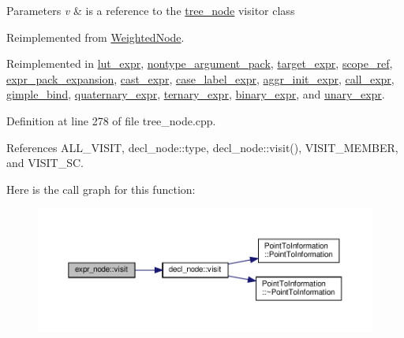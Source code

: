 \begin{DoxyParams}{Parameters}
{\em v} & is a reference to the \hyperlink{classtree__node}{tree\+\_\+node} visitor class \\
\hline
\end{DoxyParams}


Reimplemented from \hyperlink{structWeightedNode_a6f976feccb640a60f96475a668314fde}{Weighted\+Node}.



Reimplemented in \hyperlink{structlut__expr_a038fb8662e73256339281dac776155d0}{lut\+\_\+expr}, \hyperlink{structnontype__argument__pack_a254f0396e0ad2b47a793f8cb7f5b233a}{nontype\+\_\+argument\+\_\+pack}, \hyperlink{structtarget__expr_a69a7da18ea0d8b008cec659f2a24b63e}{target\+\_\+expr}, \hyperlink{structscope__ref_ab9bfdbf6812bceab436f39ea51304058}{scope\+\_\+ref}, \hyperlink{structexpr__pack__expansion_aeebf07512e982ce8b1fb21276362c6d4}{expr\+\_\+pack\+\_\+expansion}, \hyperlink{structcast__expr_a6f67dad818bc71c65e92f9105faf29f6}{cast\+\_\+expr}, \hyperlink{structcase__label__expr_ae05b2b2dac08585cdcf52aa97190ed4c}{case\+\_\+label\+\_\+expr}, \hyperlink{structaggr__init__expr_af28d5b47d09253a4ab8b59fbf776369d}{aggr\+\_\+init\+\_\+expr}, \hyperlink{structcall__expr_aeb0867ff82c5d47f5f86dd4e149f398f}{call\+\_\+expr}, \hyperlink{structgimple__bind_a63a576886251512f6238e7055819869f}{gimple\+\_\+bind}, \hyperlink{structquaternary__expr_ad01a5f8cb89a8bc218aa66029faf2cde}{quaternary\+\_\+expr}, \hyperlink{structternary__expr_a3bb8b37b29b4cb797c4872c773184f5b}{ternary\+\_\+expr}, \hyperlink{structbinary__expr_a01572c9c6e0d6bee6dadbb1a074cd075}{binary\+\_\+expr}, and \hyperlink{structunary__expr_a0373bfbbec394ab8d9e88b5ff6d60890}{unary\+\_\+expr}.



Definition at line 278 of file tree\+\_\+node.\+cpp.



References A\+L\+L\+\_\+\+V\+I\+S\+IT, decl\+\_\+node\+::type, decl\+\_\+node\+::visit(), V\+I\+S\+I\+T\+\_\+\+M\+E\+M\+B\+ER, and V\+I\+S\+I\+T\+\_\+\+SC.

Here is the call graph for this function\+:
\nopagebreak
\begin{figure}[H]
\begin{center}
\leavevmode
\includegraphics[width=350pt]{de/ddc/structexpr__node_aac767878f13ca07371dde2c3938ef38a_cgraph}
\end{center}
\end{figure}


